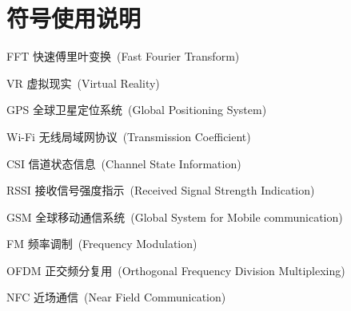 \chapter*{符号使用说明}

\begin{denotation}

\item[FFT] 快速傅里叶变换~(Fast Fourier Transform)
\item[VR] 虚拟现实~(Virtual Reality)
\item[GPS]  全球卫星定位系统~(Global Positioning System)
\item [Wi-Fi] 无线局域网协议~(Transmission Coefficient)
\item[CSI] 信道状态信息~(Channel State Information)
\item[RSSI] 接收信号强度指示~(Received Signal Strength Indication)
\item[GSM] 全球移动通信系统~(Global System for Mobile communication)
\item[FM] 频率调制~(Frequency Modulation)
\item[OFDM] 正交频分复用~(Orthogonal Frequency Division Multiplexing)
\item[NFC] 近场通信~(Near Field Communication)

\end{denotation}
